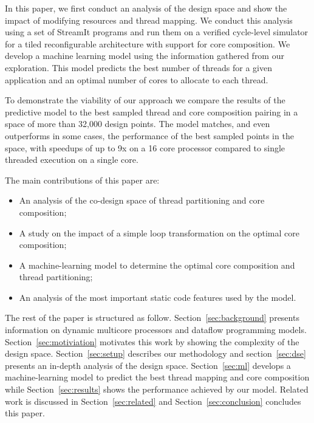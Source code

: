 In this paper, we first conduct an analysis of the design space and show the impact of modifying resources and thread mapping.
We conduct this analysis using a set of StreamIt programs and run them on a verified cycle-level simulator for a tiled reconfigurable architecture with support for core composition.
We develop a machine learning model using the information gathered from our exploration.
This model predicts the best number of threads for a given application and an optimal number of cores to allocate to each thread.

To demonstrate the viability of our approach we compare the results of the predictive model to the best sampled thread and core composition pairing in a space of more than 32,000 design points.
The model matches, and even outperforms in some cases, the performance of the best sampled points in the space, with speedups of up to 9x on a 16 core processor compared to single threaded execution on a single core. 

The main contributions of this paper are:
\vspace{-1mm}
\begin{itemize}
\item An analysis of the co-design space of thread partitioning and core composition;
\item A study on the impact of a simple loop transformation on the optimal core composition;
\item A machine-learning model to determine the optimal core composition and thread partitioning;
\item An analysis of the most important static code features used by the model.
\end{itemize}


The rest of the paper is structured as follow.
Section~\ref{sec:background} presents information on dynamic multicore processors and dataflow programming models.
Section~\ref{sec:motiviation} motivates this work by showing the complexity of the design space.
Section~\ref{sec:setup} describes our methodology and section~\ref{sec:dse} presents an in-depth analysis of the design space.
Section~\ref{sec:ml} develops a machine-learning model to predict the best thread mapping and core composition while Section~\ref{sec:results} shows the performance achieved by our model.
Related work is discussed in Section~\ref{sec:related} and Section~\ref{sec:conclusion} concludes this paper.
